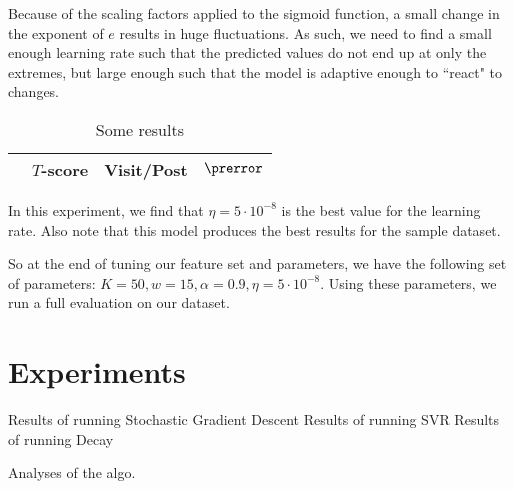 Because of the scaling factors applied to the sigmoid function, a small change 
in the exponent of $e$ results in huge fluctuations. As such, we need to find a 
small enough learning rate such that the predicted values do not end up at only 
the extremes, but large enough such that the model is adaptive enough to 
``react" to changes.

\begin{table}
\begin{center}
\begin{tabular}{| l | c | c | c |}
\hline
& $T$-score			   &	Visit/Post & 	$\prerror$\\
\hline
	
\hline
\end{tabular}
\end{center}
\caption{Some results}\label{tbl:par_tune_learning}
\end{table}

In this experiment, we find that $\eta=5\cdot10^{-8}$ is the best value for the 
learning rate. Also note that this model produces the best results for the 
sample dataset.


So at the end of tuning our feature set and parameters, we have the following 
set of parameters: $K = 50, w = 15, \alpha = 0.9, \eta = 5\cdot10^{-8}$. Using 
these parameters, we run a full evaluation on our dataset.

\section{Experiments}

Results of running Stochastic Gradient Descent
Results of running SVR
Results of running Decay


Analyses of the algo.




